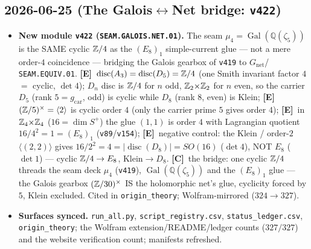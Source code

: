 \documentclass[11pt]{article}
\providecommand{\mE}{\textbf{[E]}}\providecommand{\mC}{\textbf{[C]}}
\providecommand{\vref}[1]{\texttt{#1}}
\providecommand{\gcar}{g_{\mathrm{car}}}\providecommand{\Nfam}{N_{\mathrm{fam}}}
\begin{document}
\subsection*{2026-06-25 (The Galois$\leftrightarrow$Net bridge: \texttt{v422})}
\begin{itemize}
\item \textbf{New module \texttt{v422} (\texttt{SEAM.GALOIS.NET.01}).} The seam
$\mu_4=\operatorname{Gal}(\mathbb Q(\zeta_5))$ is the SAME cyclic $\mathbb{Z}/4$ as the $(E_8)_1$ simple-current glue
--- not a mere order-$4$ coincidence --- bridging the Galois gearbox of \vref{v419} to $G_{\mathrm{net}}$/%
\texttt{SEAM.EQUIV.01}. \mE\ $\operatorname{disc}(A_3)=\operatorname{disc}(D_5)=\mathbb{Z}/4$ (one Smith invariant
factor $4$ $=$ cyclic, $\det4$); $D_n$ disc is $\mathbb{Z}/4$ for $n$ odd, $\mathbb{Z}_2{\times}\mathbb{Z}_2$ for $n$ even, so the
carrier $D_5$ (rank $5=\gcar$, odd) is cyclic while $D_8$ (rank $8$, even) is Klein; \mE\
$(\mathbb{Z}/5)^\times=\langle2\rangle$ is cyclic order $4$ (only the carrier prime $5$ gives order $4$); \mE\ in
$\mathbb{Z}_4{\times}\mathbb{Z}_4$ ($16=\dim S^+$) the glue $(1,1)$ is order $4$ with Lagrangian quotient
$16/4^2=1=(E_8)_1$ (\vref{v89}/\vref{v154}); \mE\ negative control: the Klein / order-$2$
$\langle(2,2)\rangle$ gives $16/2^2=4=|\!\operatorname{disc}(D_8)|=SO(16)$ ($\det4$), NOT $E_8$ ($\det1$) ---
cyclic $\mathbb{Z}/4\to E_8$, Klein$\to D_8$. \mC\ the bridge: one cyclic $\mathbb{Z}/4$ threads the seam deck $\mu_4$
(\vref{v419}), $\operatorname{Gal}(\mathbb Q(\zeta_5))$ and the $(E_8)_1$ glue --- the Galois gearbox
$(\mathbb{Z}/30)^\times$ IS the holomorphic net's glue, cyclicity forced by $5$, Klein excluded. Cited in
\texttt{origin\_theory}; Wolfram-mirrored ($324\to327$).
\item \textbf{Surfaces synced.} \texttt{run\_all.py}, \texttt{script\_registry.csv},
\texttt{status\_ledger.csv}, \texttt{origin\_theory}; the Wolfram extension/README/ledger counts
($327/327$) and the website verification count; manifests refreshed.
\end{itemize}
\end{document}
